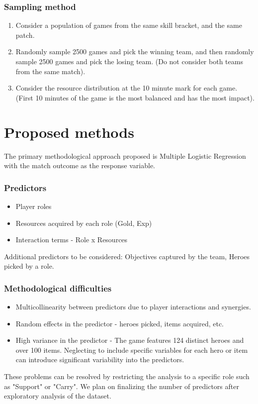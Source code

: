 \documentclass[12pt]{scrreprt}
\begin{document}
\subsubsection*{Sampling method}
\begin{enumerate}
    \item Consider a population of games from the same skill bracket, and the same patch.
    \item Randomly sample 2500 games and pick the winning team, and then randomly
    sample 2500 games and pick the losing team. (Do not consider both teams from the same match).
    \item Consider the resource distribution at the 10 minute mark for each game.
    \\(First 10 minutes of the game is the most balanced and has the most impact).
\end{enumerate}

\newpage
\section*{Proposed methods}
The primary methodological approach proposed is Multiple Logistic Regression with
the match outcome as the response variable.
\subsubsection*{Predictors}
\begin{itemize}
    \item Player roles
    \item Resources acquired by each role (Gold, Exp)
    \item Interaction terms - Role x Resources
\end{itemize}
Additional predictors to be considered: Objectives captured by the team, Heroes
picked by a role.

\subsubsection*{Methodological difficulties}
\begin{itemize}
    \item Multicollinearity between predictors due to player interactions and
    synergies.
    \item Random effects in the predictor - heroes picked, items acquired, etc.
    \item High variance in the predictor - The game features 124 distinct heroes
    and over 100 items. Neglecting to include specific variables for each hero
    or item can introduce significant variability into the predictors.
\end{itemize}
These problems can be resolved by restricting the analysis to a specific role
such as "Support" or "Carry". We plan on finalizing the number of predictors after
exploratory analysis of the dataset.
\end{document}
